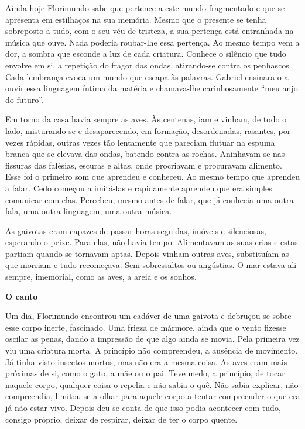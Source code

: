 Ainda hoje Florimundo sabe que pertence a este mundo fragmentado e que
se apresenta em estilhaços na sua memória. Mesmo que o presente se tenha
sobreposto a tudo, com o seu véu de tristeza, a sua pertença está
entranhada na música que ouve. Nada poderia roubar-lhe essa pertença. Ao
mesmo tempo vem a dor, a sombra que esconde a luz de cada criatura.
Conhece o silêncio que tudo envolve em si, a repetição do fragor das
ondas, atirando-se contra os penhascos. Cada lembrança evoca um mundo
que escapa às palavras. Gabriel ensinara-o a ouvir essa linguagem íntima
da matéria e chamava-lhe carinhosamente ``meu anjo do futuro''.

Em torno da casa havia sempre as aves. Às centenas, iam e vinham, de
todo o lado, misturando-se e desaparecendo, em formação, desordenadas,
rasantes, por vezes rápidas, outras vezes tão lentamente que pareciam
flutuar na espuma branca que se elevava das ondas, batendo contra as
rochas. Aninhavam-se nas fissuras das falésias, escuras e altas, onde
procriavam e procuravam alimento. Esse foi o primeiro som que aprendeu e
conheceu. Ao mesmo tempo que aprendeu a falar. Cedo começou a imitá-las
e rapidamente aprendeu que era simples comunicar com elas. Percebeu,
mesmo antes de falar, que já conhecia uma outra fala, uma outra
linguagem, uma outra música.

As gaivotas eram capazes de passar horas seguidas, imóveis e
silenciosas, esperando o peixe. Para elas, não havia tempo. Alimentavam
as suas crias e estas partiam quando se tornavam aptas. Depois vinham
outras aves, substituíam as que morriam e tudo recomeçava. Sem
sobressaltos ou angústias. O mar estava ali sempre, imemorial, como as
aves, a areia e os sonhos.

\vspace*{1.8cm}
\noindent{}\textbf{O canto}

\bigskip

Um dia, Florimundo encontrou um cadáver de uma gaivota e debruçou-se
sobre esse corpo inerte, fascinado. Uma frieza de mármore, ainda que o
vento fizesse oscilar as penas, dando a impressão de que algo ainda se
movia. Pela primeira vez viu uma criatura morta. A princípio não
compreendeu, a ausência de movimento. Já tinha visto insectos mortos,
mas não era a mesma coisa. As aves eram mais próximas de si, como o
gato, a mãe ou o pai. Teve medo, a princípio, de tocar naquele corpo,
qualquer coisa o repelia e não sabia o quê. Não sabia explicar, não
compreendia, limitou-se a olhar para aquele corpo a tentar compreender o
que era já não estar vivo. Depois deu-se conta de que isso podia
acontecer com tudo, consigo próprio, deixar de respirar, deixar de ter o
corpo quente.

